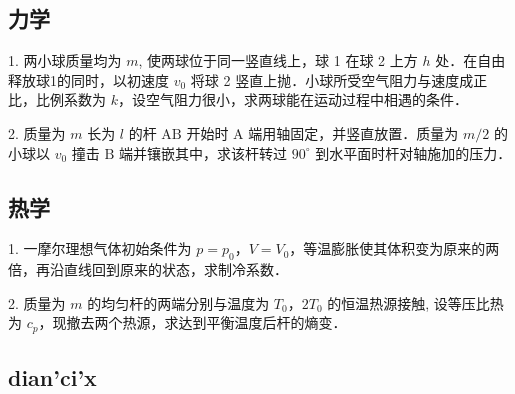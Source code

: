 
\subsection{力学}
1. 两小球质量均为 $m$, 使两球位于同一竖直线上，球 1 在球 2 上方 $h$ 处．在自由释放球1的同时，以初速度 $v_{0}$ 将球 2 竖直上抛．小球所受空气阻力与速度成正比，比例系数为 $k$，设空气阻力很小，求两球能在运动过程中相遇的条件．

2. 质量为 $m$ 长为 $l$ 的杆 $\mathrm{AB}$ 开始时 $\mathrm{A}$ 端用轴固定，并竖直放置．质量为 $m / 2$ 的小球以 $v_{0}$ 撞击 $\mathrm{B}$ 端并镶嵌其中，求该杆转过 $90^{\circ}$ 到水平面时杆对轴施加的压力．
\subsection{热学}
1. 一摩尔理想气体初始条件为 $p=p_{0}$，$V=V_{0}$，等温膨胀使其体积变为原来的两倍，再沿直线回到原来的状态，求制冷系数．

2. 质量为 $m$ 的均匀杆的两端分别与温度为 $T_{0}$，$2T_{0}$ 的恒温热源接触, 设等压比热为 $c_{p}$，现撤去两个热源，求达到平衡温度后杆的熵变．
\subsection{dian'ci'x}